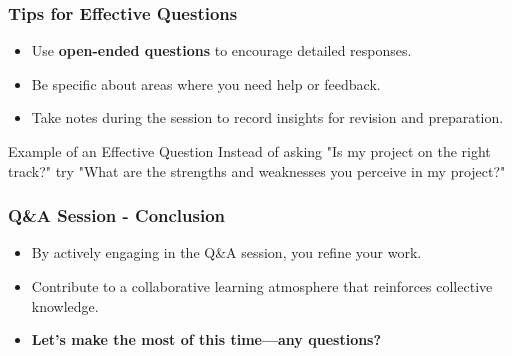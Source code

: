 \documentclass[aspectratio=169]{beamer}
\begin{document}
\begin{frame}[fragile]
  \frametitle{Tips for Effective Questions}
  \begin{itemize}
    \item Use \textbf{open-ended questions} to encourage detailed responses.
    \item Be specific about areas where you need help or feedback.
    \item Take notes during the session to record insights for revision and preparation.
  \end{itemize}

  \begin{block}{Example of an Effective Question}
    Instead of asking "Is my project on the right track?" try "What are the strengths and weaknesses you perceive in my project?"
  \end{block}
\end{frame}

\begin{frame}[fragile]
  \frametitle{Q\&A Session - Conclusion}
  \begin{itemize}
    \item By actively engaging in the Q\&A session, you refine your work.
    \item Contribute to a collaborative learning atmosphere that reinforces collective knowledge.
    \item \textbf{Let's make the most of this time—any questions?}
  \end{itemize}
\end{frame}
\end{document}
